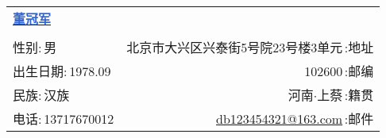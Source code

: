\newcommand{\myheader}{
    \begin{tabular*}{\textwidth}{l@{\extracolsep{\fill}}r}
        \textbf{\href{https://herechen.github.io}{\LARGE \textcolor{highlight}{董冠军}}} \\
        \\
        {\color{blue}性别:}$\,$男 & 北京市大兴区兴泰街5号院23号楼3单元$\,${\color{blue}:地址} \\
        {\color{blue}出生日期:}$\,$1978.09 & 102600$\,${\color{blue}:邮编} \\
        {\color{blue}民族:}$\,$汉族 & 河南$\cdot$上蔡$\,${\color{blue}:籍贯} \\
        {\color{blue}电话:}$\,$13717670012 & \href{mailto:db123454321@163.com}{db123454321@163.com}$\,${\color{blue}:邮件} \\
    \end{tabular*}\\\vspace{0.1in}}

\myheader
